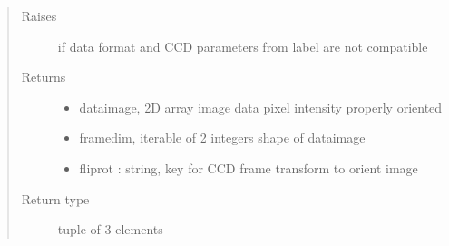 \documentclass[letterpaper,10pt,english]{sphinxmanual}
\begin{document}
\begin{fulllineitems}
\begin{quote}
\begin{description}
\begin{itemize}
\end{itemize}

\item[{Raises}] \leavevmode
{} \textendash{} if data format and CCD parameters from label are not compatible

\item[{Returns}] \leavevmode
\begin{itemize}
\item {} 
dataimage, 2D array image data pixel intensity properly oriented

\item {} 
framedim, iterable of 2 integers shape of dataimage

\item {} 
fliprot : string, key for CCD frame transform to orient image

\end{itemize}


\item[{Return type}] \leavevmode
tuple of 3 elements

\end{description}\end{quote}

\end{fulllineitems}

\end{document}
